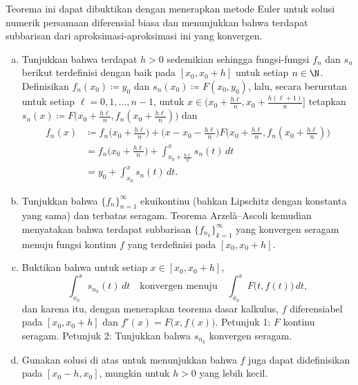 \begin{exercise}
Teorema ini dapat dibuktikan dengan menerapkan metode Euler
untuk solusi numerik persamaan diferensial biasa dan menunjukkan bahwa
terdapat subbarisan dari aproksimasi-aproksimasi ini yang konvergen.
\begin{enumerate}[a)]
\item
Tunjukkan
bahwa terdapat $h > 0$ sedemikian sehingga fungsi-fungsi
$f_n$ dan $s_n$ berikut terdefinisi dengan baik pada $[x_0,x_0+h]$
untuk setiap $n \in \N$.
Definisikan $f_n(x_0) \coloneqq y_0$ dan $s_n(x_0) \coloneqq F(x_0,y_0)$,
lalu, secara berurutan untuk setiap $\ell=0,1,\ldots,n-1$,
untuk $x \in \bigl(x_0+\frac{h\ell}{n},x_0+\frac{h(\ell+1)}{n}\bigr]$
tetapkan $s_n(x) \coloneqq F\bigl(x_0+\tfrac{h\ell}{n},
f_n(x_0+\tfrac{h\ell}{n})\bigr)$ dan
\begin{equation*}
\begin{split}
f_n(x) & \coloneqq f_n\bigl(x_0+\tfrac{h\ell}{n}\bigr)
+ \bigl(x-x_0-\tfrac{h\ell}{n}\bigr) F\bigl(x_0+\tfrac{h\ell}{n},
f_n(x_0+\tfrac{h\ell}{n}) \bigr) \\
& = f_n\bigl(x_0+\tfrac{h\ell}{n}\bigr)
+ \int_{x_0+\tfrac{h\ell}{n}}^x s_n(t) \, dt \\
& = y_0
+ \int_{x_0}^x s_n(t) \, dt .
\end{split}
\end{equation*}
\item
Tunjukkan bahwa $\{ f_n \}_{n=1}^\infty$ ekuikontinu
(bahkan Lipschitz dengan konstanta yang sama) dan terbatas seragam.
Teorema Arzel\`a--Ascoli kemudian menyatakan bahwa terdapat
subbarisan $\{ f_{n_k} \}_{k=1}^\infty$ yang konvergen seragam
menuju fungsi kontinu $f$ yang terdefinisi pada $[x_0,x_0+h]$.
\item
Buktikan bahwa untuk setiap $x \in [x_0,x_0+h]$,
\begin{equation*}
\int_{x_0}^x s_{n_k}(t) \, dt
\quad
\text{konvergen menuju}
\quad
\int_{x_0}^x F\bigl(t,f(t)\bigr) \, dt ,
\end{equation*}
dan karena itu, dengan menerapkan teorema dasar kalkulus,
$f$ diferensiabel pada $[x_0,x_0+h]$ dan $f'(x) = F\bigl(x,f(x)\bigr)$.
Petunjuk 1: $F$ kontinu seragam.
Petunjuk 2: Tunjukkan bahwa $s_{n_k}$ konvergen seragam.
\item
Gunakan solusi di atas untuk menunjukkan bahwa $f$ juga dapat didefinisikan
pada $[x_0-h,x_0]$,
mungkin untuk $h > 0$ yang lebih kecil.
\end{enumerate}
\end{exercise}


